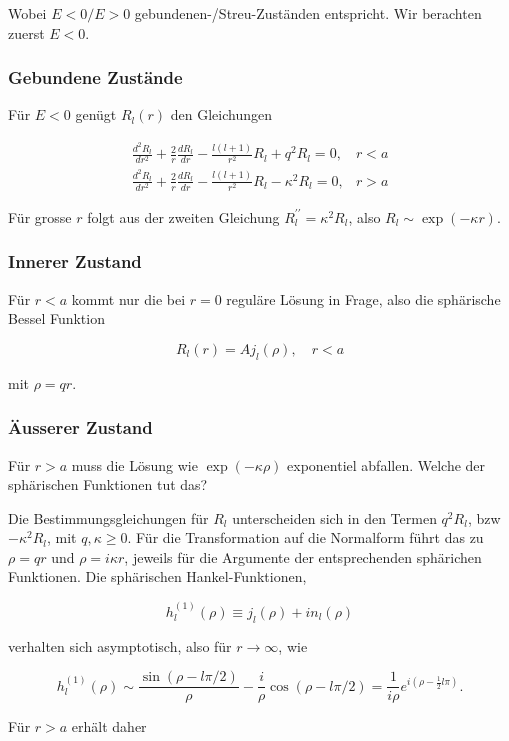 \documentclass[10pt, letterpaper]{article}
\begin{document}
Wobei $E<0 / E>0$ gebundenen-/Streu-Zuständen entspricht. Wir berachten zuerst $E<0$.

\subsubsection*{Gebundene Zustände}
Für $E<0$ genügt $R_{l}(r)$ den Gleichungen

$$
\begin{array}{ll}
\frac{d^{2} R_{l}}{d r^{2}}+\frac{2}{r} \frac{d R_{l}}{d r}-\frac{l(l+1)}{r^{2}} R_{l}+q^{2} R_{l}=0, & r<a \\
\frac{d^{2} R_{l}}{d r^{2}}+\frac{2}{r} \frac{d R_{l}}{d r}-\frac{l(l+1)}{r^{2}} R_{l}-\kappa^{2} R_{l}=0, & r>a
\end{array}
$$

Für grosse $r$ folgt aus der zweiten Gleichung $R_{l}^{\prime \prime}=\kappa^{2} R_{l}$, also $R_{l} \sim \exp (-\kappa r)$.

\subsubsection*{Innerer Zustand}
Für $r<a$ kommt nur die bei $r=0$ reguläre Lösung in Frage, also die sphärische Bessel Funktion

$$
R_{l}(r)=A j_{l}(\rho), \quad r<a
$$

mit $\rho=q r$.

\subsubsection*{Äusserer Zustand}
Für $r>a$ muss die Lösung wie $\exp (-\kappa \rho)$ exponentiel abfallen. Welche der sphärischen Funktionen tut das?

Die Bestimmungsgleichungen für $R_{l}$ unterscheiden sich in den Termen $q^{2} R_{l}$, bzw $-\kappa^{2} R_{l}$, mit $q, \kappa \geq 0$. Für die Transformation auf die Normalform führt das zu $\rho=q r$ und $\rho=i \kappa r$, jeweils für die Argumente der entsprechenden sphärichen Funktionen. Die sphärischen Hankel-Funktionen,

$$
h_{l}^{(1)}(\rho) \equiv j_{l}(\rho)+i n_{l}(\rho)
$$

verhalten sich asymptotisch, also für $r \rightarrow \infty$, wie

$$
h_{l}^{(1)}(\rho) \sim \frac{\sin (\rho-l \pi / 2)}{\rho}-\frac{i}{\rho} \cos (\rho-l \pi / 2)=\frac{1}{i \rho} e^{i\left(\rho-\frac{1}{2} l \pi\right)} .
$$

Für $r>a$ erhält daher
\end{document}
